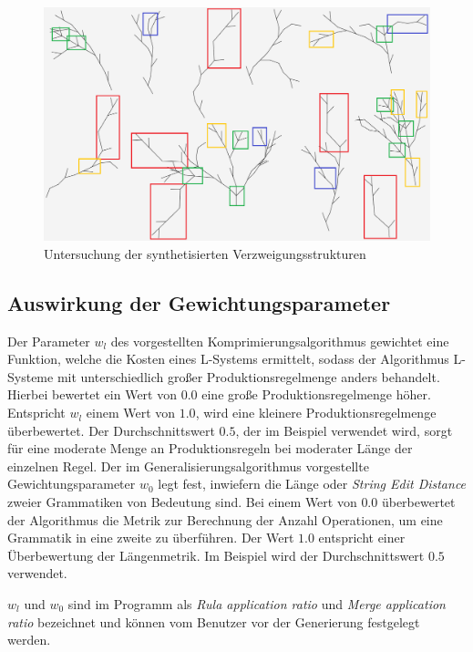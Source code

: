 \begin{figure}[H]
    \centering
    \includegraphics[width=14.5cm]{../images/synthesis_marks.png}
    \caption{Untersuchung der synthetisierten Verzweigungsstrukturen}
\end{figure}

\subsection*{Auswirkung der Gewichtungsparameter}
Der Parameter $w_l$ des vorgestellten Komprimierungsalgorithmus gewichtet eine Funktion,
welche die Kosten eines L-Systems ermittelt, sodass der Algorithmus L-Systeme mit unterschiedlich
großer Produktionsregelmenge anders behandelt.
Hierbei bewertet ein Wert von $0.0$ eine große Produktionsregelmenge höher.
Entspricht $w_l$ einem Wert von $1.0$, wird eine kleinere Produktionsregelmenge überbewertet.
Der Durchschnittswert $0.5$, der im Beispiel verwendet wird, sorgt für eine moderate Menge an
Produktionsregeln bei moderater Länge der einzelnen Regel.
Der im Generalisierungsalgorithmus vorgestellte Gewichtungsparameter $w_0$ legt fest, inwiefern
die Länge oder \textit{String Edit Distance} zweier Grammatiken von Bedeutung sind.
Bei einem Wert von $0.0$ überbewertet der Algorithmus die Metrik zur Berechnung der Anzahl Operationen,
um eine Grammatik in eine zweite zu überführen.
Der Wert $1.0$ entspricht einer Überbewertung der Längenmetrik.
Im Beispiel wird der Durchschnittswert $0.5$ verwendet.

$w_l$ und $w_0$ sind im Programm als \textit{Rula application ratio} und \textit{Merge application ratio}
bezeichnet und können vom Benutzer vor der Generierung festgelegt werden.